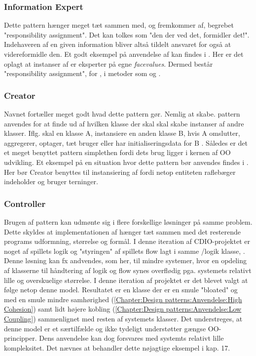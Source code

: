 \subsubsection{Information Expert}\label{Chapter:Design patterns:Anvendelse:Information Expert}
Dette pattern hænger meget tæt sammen med, og fremkommer af, begrebet "responsibility assignment". Det kan tolkes som "den der ved det, formidler det!". Indehaveren af en given information bliver altså tildelt ansvaret for også at videreformidle den. Et godt eksempel på anvendelse af  kan findes i . Her er det oplagt at instanser af  er eksperter på egne \textit{facevalues}. Dermed består "responsibility assignment", for , i metoder som  og . 

\subsubsection{Creator}\label{Chapter:Design patterns:Anvendelse:Creator}
Navnet fortæller meget godt hvad dette pattern gør. Nemlig at skabe.  pattern anvendes for at finde ud af hvilken klasse der skal skal skabe instanser af andre klasser. Iflg.  skal en klasse A, instansiere en anden klasse B, hvis A omslutter, aggregerer, optager, tæt bruger eller har initialiseringsdata for B \cite{umlbook}. Således er det et meget benyttet pattern simplethen fordi dets brug ligger i kernen af OO udvikling. Et eksempel på en situation hvor dette pattern bør anvendes findes i . Her bør Creator benyttes til instansiering af  fordi netop entiteten raflebæger indeholder og bruger terninger. 

\subsubsection{Controller}\label{Chapter:Design patterns:Anvendelse:Controller}
Brugen af  pattern kan udmønte sig i flere forskellige løsninger på samme problem. Dette skyldes at implementationen af  hænger tæt sammen med det resterende programs udformning, størrelse og formål. I denne iteration af CDIO-projektet er noget af spillets logik og "styringen" af spillets flow lagt i samme /logik klasse, . Denne løsning kan fx andvendes, som her, til mindre systemer, hvor en opdeling af klasserne til håndtering af logik og flow synes overflødig pga. systemets relativt lille og overskuelige størrelse. I denne iteration af projektet er det blevet valgt at følge netop denne model. Resultatet er en klasse  der er en smule "bloated" og med en smule mindre samhørighed (\vref{Chapter:Design patterns:Anvendelse:High Cohesion}) samt lidt højere kobling (\vref{Chapter:Design patterns:Anvendelse:Low Coupling}) sammenlignet med resten af systemets klasser. Det understreges, at denne model er et særtilfælde og ikke tydeligt understøtter gængse OO-principper. Dens anvendelse kan dog forsvares med systemts relativt lille kompleksitet. Det nævnes at \cite{umlbook} behandler dette nøjagtige eksempel i kap. 17.

